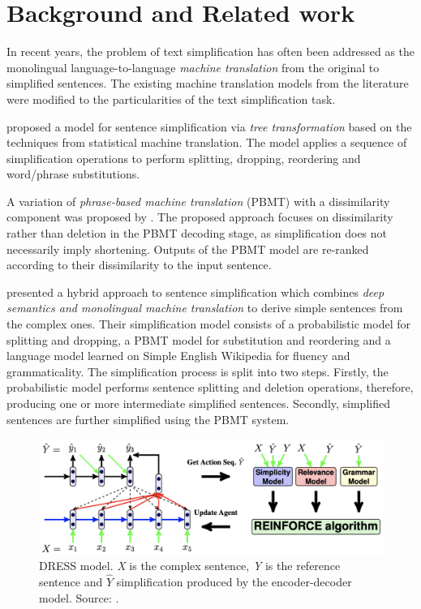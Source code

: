 
\chapter{Background and Related work}
\label{chap:related_works}

In recent years, the problem of text simplification has often been addressed as the monolingual language-to-language \emph{machine translation} from the original to simplified sentences. The existing machine translation models from the literature were modified to the particularities of the text simplification task.

\cite{zhu-etal-2010-monolingual} proposed a model for sentence simplification via \emph{tree transformation} based on the techniques from statistical machine translation. The model applies a sequence of simplification operations to perform splitting, dropping, reordering and word/phrase substitutions. 

A variation of \emph{phrase-based machine translation} (PBMT) with a dissimilarity component was proposed by \cite{wubben-etal-2012-sentence}. The proposed approach focuses on dissimilarity rather than deletion in the PBMT decoding stage, as simplification does not necessarily imply shortening. Outputs of the PBMT model are re-ranked according to their dissimilarity to the input sentence.

\cite{narayan-gardent-2014-hybrid} presented a hybrid approach to sentence simplification which combines \emph{deep semantics and monolingual machine translation} to derive simple sentences from the complex ones. Their simplification model consists of a probabilistic model for splitting and dropping, a PBMT model for substitution and reordering and a language model learned on Simple English Wikipedia for fluency and grammaticality. The simplification process is split into two steps. Firstly, the probabilistic model performs sentence splitting and deletion operations, therefore, producing one or more intermediate simplified sentences. Secondly, simplified sentences are further simplified using the PBMT system.

\begin{figure}[h]
    \centering
    \includegraphics[width=14cm]{Images/dress.png}
    \caption{DRESS model. \textit{X} is the complex sentence, \textit{Y} is the reference sentence and \textit{$\hat{Y}$} simplification produced by the encoder-decoder model. Source: \cite{zhang-lapata-2017-sentence}.}
    \label{fig:dress}
\end{figure}

